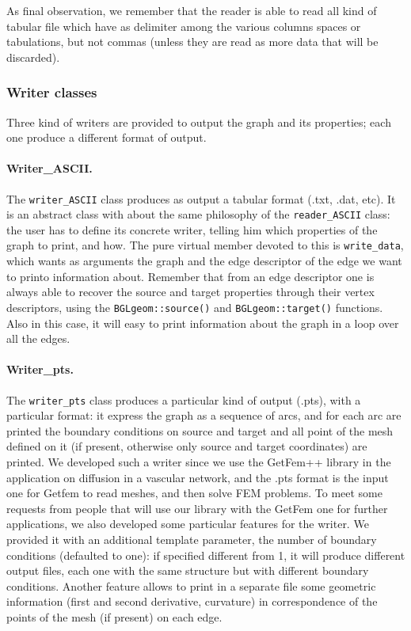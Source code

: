 \documentclass[11pt]{article} %
\begin{document}
		As final observation, we remember that the reader is able to read all kind of tabular file which have as delimiter among the various columns spaces or tabulations, but not commas (unless they are read as more data that will be discarded).
		
		\subsubsection{Writer classes}
		Three kind of writers are provided to output the graph and its properties; each one produce a different format of output.
		\paragraph{Writer\_ASCII.} The \texttt{writer\_ASCII} class produces as output a tabular format (.txt, .dat, etc). It is an abstract class with about the same philosophy of the \texttt{reader\_ASCII} class: the user has to define its concrete writer, telling him which properties of the graph to print, and how. The pure virtual member devoted to this is \texttt{write\_data}, which wants as arguments the graph and the edge descriptor of the edge we want to printo information about. Remember that from an edge descriptor one is always able to recover the source and target properties through their vertex descriptors, using the \texttt{BGLgeom::source()} and \texttt{BGLgeom::target()} functions. Also in this case, it will easy to print information about the graph in a loop over all the edges.
		\paragraph{Writer\_pts.} The \texttt{writer\_pts} class produces a particular kind of output (.pts), with a particular format: it express the graph as a sequence of arcs, and for each arc are printed the boundary conditions on source and target and all point of the mesh defined on it (if present, otherwise only source and target coordinates) are printed. We developed such a writer since we use the GetFem++ library in the application on diffusion in a vascular network, and the .pts format is the input one for Getfem to read meshes, and then solve FEM problems. \newline
		To meet some requests from people that will use our library with the GetFem one for further applications, we also developed some particular features for the writer. We provided it with an additional template parameter, the number of boundary conditions (defaulted to one): if specified different from 1, it will produce different output files, each one with the same structure but with different boundary conditions. Another feature allows to print in a separate file some geometric information (first and second derivative, curvature) in correspondence of the points of the mesh (if present) on each edge.
\end{document}
